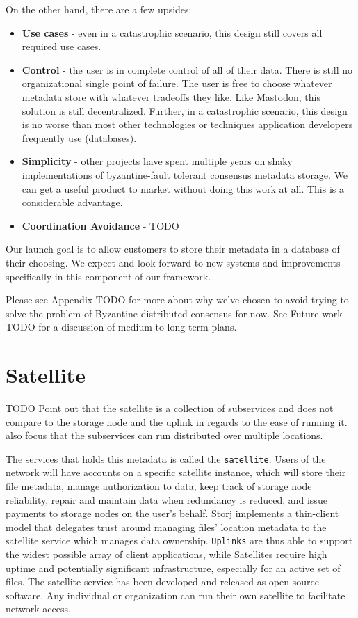 \documentclass[11pt,fleqn,openany]{book}
\newcommand{\x}[1]{{\tt #1}} \newcommand{\code}[1]{{\em #1}}
\newcommand{\todo}[1]{{\color{red} TODO #1 }}
\begin{document}
On the other hand, there are a few upsides:
\begin{itemize}
\item {\bf Use cases} - even in a catastrophic scenario, this design still
  covers all required use cases.
\item {\bf Control} - the user is in complete control of all of their data.
  There is still no organizational single point of failure. The user is free
  to choose whatever metadata store with whatever tradeoffs they like. Like
  Mastodon\cite{mastodon}, this solution is still decentralized. Further, in a
  catastrophic scenario, this design is no worse than most other technologies or
  techniques application developers frequently use (databases).
\item {\bf Simplicity} - other projects have spent multiple years on shaky
  implementations of byzantine-fault tolerant consensus metadata storage.
  We can get a useful product to market without doing this work at all.
  This is a considerable advantage.
\item {\bf Coordination Avoidance} - \todo{}
\end{itemize}

Our launch goal is to allow customers to store their metadata in a database of
their choosing. We expect and look forward to new systems and improvements
specifically in this component of our framework.

Please see Appendix \todo{} for more about why we've chosen to avoid trying to
solve the problem of Byzantine distributed consensus for now. See Future work
\todo{} for a discussion of medium to long term plans.

\section{Satellite}

\todo{Point out that the satellite is a collection of subservices and does
not compare to the storage node and the uplink in regards to the ease of
running it. also focus that the subservices can run distributed over multiple
locations.}

The services that holds this metadata is called the \x{satellite}. Users of the
network will have accounts on a specific satellite instance, which will store
their file metadata, manage authorization to data, keep track of storage
node reliability, repair and maintain data when redundancy is reduced,
and issue payments to storage nodes on the user's behalf.
Storj implements a thin-client model that delegates trust around managing
files' location metadata to the satellite service which manages data
ownership. \x{Uplinks}
are thus able to support the widest possible array of client applications, while
Satellites require high uptime and potentially significant infrastructure,
especially for an active set of files.
The satellite service has been developed and released as open source software.
Any individual or organization can run their own satellite to facilitate
network access.
\end{document}
